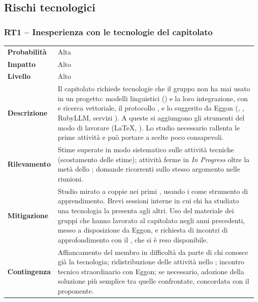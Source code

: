 \documentclass[documento]{gpt}
\makeatletter
\newcommand{\rischio}[9]{%
  \subsubsection{#1 -- #2}\label{rischio:#1}
  \noindent
  \begin{tabularx}{\linewidth}{@{}>{\raggedright\arraybackslash\bfseries}p{2.7cm}>{\raggedright\arraybackslash}X@{}}
    \toprule
    Probabilità & #3 \\
    Impatto     & #4 \\
    Livello     & #5 \\
    \midrule
    Descrizione & #6 \\
    \addlinespace
    Rilevamento & #7 \\
    \addlinespace
    Mitigazione & #8 \\
    \addlinespace
    Contingenza & #9 \\
    \bottomrule
  \end{tabularx}
  \medskip
}
\makeatother
\begin{document}
\subsection{Rischi tecnologici}

\rischio{RT1}{Inesperienza con le tecnologie del capitolato}{Alta}{Alto}{Alto}
{Il capitolato richiede tecnologie che il gruppo non ha mai usato in un
 progetto: modelli linguistici (\glo{LLM}) e la loro integrazione,
 \glo{RAG} con \glo{Embedding} e ricerca vettoriale, il protocollo
 \glo{MCP}, e lo \glo{Stack tecnologico} suggerito da Eggon (\glo{Ruby on Rails},
 \glo{Angular}, RubyLLM, servizi \glo{AWS}). A queste si aggiungono gli strumenti del
 modo di lavorare (\LaTeX{}, \glo{GitHub Actions}). Lo studio necessario rallenta
 le prime attività e può portare a scelte poco consapevoli.}
{Stime superate in modo sistematico sulle attività tecniche (scostamento
 delle stime); attività ferme in \textit{In Progress} oltre la metà dello
 \glo[Sprint]{\textit{sprint}}; domande ricorrenti sullo stesso argomento nelle riunioni.}
{Studio mirato a coppie nei primi \glo[Sprint]{\textit{sprint}}, usando i \glo{PoC} come
 strumento di apprendimento.
 Brevi sessioni interne in cui chi ha studiato una tecnologia la presenta
 agli altri. Uso del materiale dei gruppi che hanno lavorato al capitolato
 negli anni precedenti, messo a disposizione da Eggon, e richiesta di
 incontri di approfondimento con il \glo{Proponente}, che si è reso
 disponibile.}
{Affiancamento del membro in difficoltà da parte di chi conosce già la
 tecnologia; ridistribuzione delle attività nello \glo[Sprint]{\textit{sprint}}; incontro
 tecnico straordinario con Eggon; se necessario, adozione della soluzione
 più semplice tra quelle confrontate, concordata con il proponente.}
\end{document}

